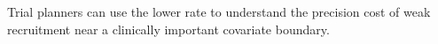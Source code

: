 Trial planners can use the lower rate to understand the precision cost of weak recruitment near a clinically important covariate boundary.